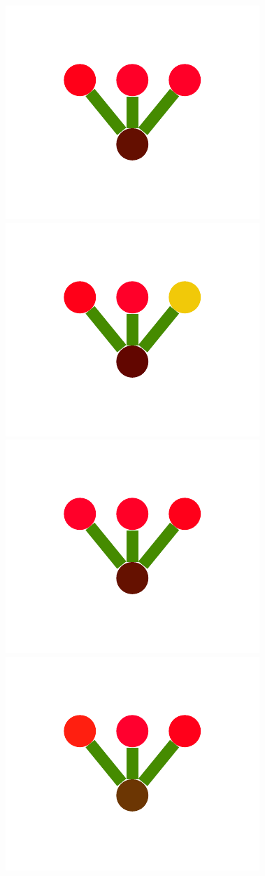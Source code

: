 \documentclass[a4paper,10pt]{article}
\begin{document}
\begin{figure}
{    \includegraphics[scale=.26]{./figures/4-2-2-mergeprog-pre-3.pdf}
    \includegraphics[scale=.26]{./figures/4-2-2-mergeprog-pre-4.pdf}
    \includegraphics[scale=.26]{./figures/4-2-2-mergeprog-pre-5.pdf}
    \includegraphics[scale=.26]{./figures/4-2-2-mergeprog-pre-6.pdf}
}
\end{figure}
\end{document}
